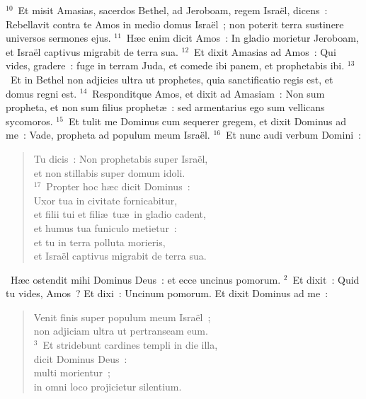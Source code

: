 ${}^{10}$~Et misit Amasias, sacerdos Bethel, ad Jeroboam, regem Isra\"el, dicens~: Rebellavit contra te Amos in medio domus Isra\"el~; non poterit terra sustinere universos sermones ejus.
${}^{11}$~H\ae c enim dicit Amos~: In gladio morietur Jeroboam, et Isra\"el captivus migrabit de terra sua.
${}^{12}$~Et dixit Amasias ad Amos~: Qui vides, gradere~: fuge in terram Juda, et comede ibi panem, et prophetabis ibi.
${}^{13}$~Et in Bethel non adjicies ultra ut prophetes, quia sanctificatio regis est, et domus regni est.
${}^{14}$~Responditque Amos, et dixit ad Amasiam~: Non sum propheta, et non sum filius prophet\ae~: sed armentarius ego sum vellicans sycomoros.
${}^{15}$~Et tulit me Dominus cum sequerer gregem, et dixit Dominus ad me~: Vade, propheta ad populum meum Isra\"el.
${}^{16}$~Et nunc audi verbum Domini~: \begin{flushleft}\begin{verse}Tu dicis~: Non prophetabis super Isra\"el,\\ et non stillabis super domum idoli.\\
${}^{17}$~Propter hoc h\ae c dicit Dominus~:\\ Uxor tua in civitate fornicabitur,\\ et filii tui et fili\ae\ tu\ae\ in gladio cadent,\\ et humus tua funiculo metietur~:\\ et tu in terra polluta morieris,\\ et Isra\"el captivus migrabit de terra sua.\end{verse}\end{flushleft}


~\lettrine[lines=10,image=true,loversize=0.05,lraise=-0.03]{H}{}\ae c ostendit mihi Dominus Deus~: et ecce uncinus pomorum.
${}^{2}$~Et dixit~: Quid tu vides, Amos~? Et dixi~: Uncinum pomorum. Et dixit Dominus ad me~: \begin{flushleft}\begin{verse}Venit finis super populum meum Isra\"el~;\\ non adjiciam ultra ut pertranseam eum.\\
${}^{3}$~Et stridebunt cardines templi in die illa,\\ dicit Dominus Deus~:\\ multi morientur~;\\ in omni loco projicietur silentium.\end{verse}\end{flushleft}


